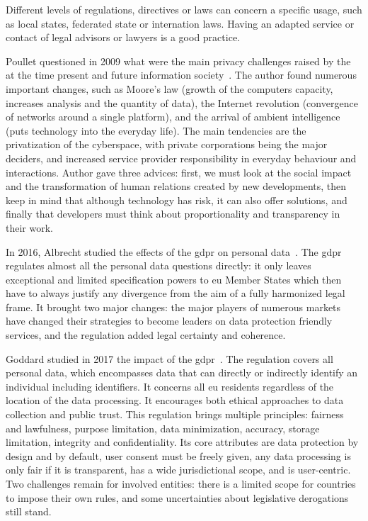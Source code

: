 Different levels of regulations, directives or laws can concern a specific usage, such as local states, federated state or internation laws. Having an adapted service or contact of legal advisors or lawyers is a good practice.

Poullet questioned in 2009 what were the main privacy challenges raised by the at the time present and future information society~\cite{poullet_data_2009}. The author found numerous important changes, such as Moore's law (growth of the computers capacity, increases analysis and the quantity of data), the Internet revolution (convergence of networks around a single platform), and the arrival of ambient intelligence (puts technology into the everyday life). The main tendencies are the privatization of the cyberspace, with private corporations being the major deciders, and increased service provider responsibility in everyday behaviour and interactions. Author gave three advices: first, we must look at the social impact and the transformation of human relations created by new developments, then keep in mind that although technology has risk, it can also offer solutions, and finally that developers must think about proportionality and transparency in their work. %

In 2016, Albrecht studied the effects of the \gls{gdpr} on personal data~\cite{albrecht_how_2016}. The \gls{gdpr} regulates almost all the personal data questions directly: it only leaves exceptional and limited specification powers to \gls{eu} Member States which then have to always justify any divergence from the aim of a fully harmonized legal frame. It brought two major changes: the major players of numerous markets have changed their strategies to become leaders on data protection friendly services, and the regulation added legal certainty and coherence. %

Goddard studied in 2017 the impact of the \gls{gdpr}~\cite{goddard_eu_2017}. The regulation covers all personal data, which encompasses data that can directly or indirectly identify an individual including identifiers. It concerns all \gls{eu} residents regardless of the location of the data processing. It encourages both ethical approaches to data collection and public trust. This regulation brings multiple principles: fairness and lawfulness, purpose limitation, data minimization, accuracy, storage limitation, integrity and confidentiality. Its core attributes are data protection by design and by default, user consent must be freely given, any data processing is only fair if it is transparent, has a wide jurisdictional scope, and is user-centric. Two challenges remain for involved entities: there is a limited scope for countries to impose their own rules, and some uncertainties about legislative derogations still stand. %

